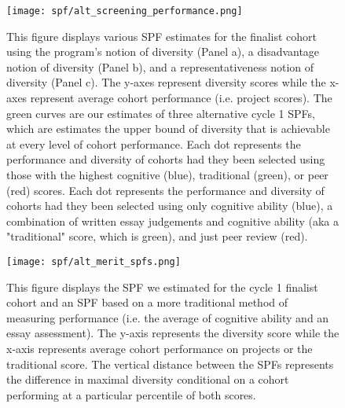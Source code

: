     \newpage
    \begin{figure}[!htb]
    \centering
        \caption{This figure displays various SPF estimates for the  finalist cohort using the program's notion of diversity (Panel a), a disadvantage notion of diversity (Panel b), and a representativeness notion of diversity (Panel c). The y-axes represent diversity scores while the x-axes represent average cohort performance (i.e. project scores). The green curves are our estimates of three alternative cycle 1 SPFs, which are estimates the upper bound of diversity that is achievable at every level of cohort performance. Each dot represents the performance and diversity of cohorts had they been selected using those with the highest cognitive (blue), traditional (green), or peer (red) scores.  Each dot represents the performance and diversity of cohorts had they been selected using only cognitive ability (blue), a combination of written essay judgements and cognitive ability (aka a "traditional" score, which is green), and just peer review (red).} \label{fig:alt_screen}
      \texttt{[image: spf/alt\_screening\_performance.png]} 
    \end{figure}
    
    \newpage
    \begin{figure}[!htb]
    \centering
        \caption{This figure displays the SPF we estimated for the cycle 1 finalist cohort and an SPF based on a more traditional method of measuring performance (i.e. the average of cognitive ability and an essay assessment). The y-axis represents the diversity score while the x-axis represents average cohort performance on projects or the traditional score. The vertical distance between the SPFs represents the difference in maximal diversity conditional on a cohort performing at a particular percentile of both scores. } \label{fig:compare_div_tradeoffs}
      \texttt{[image: spf/alt\_merit\_spfs.png]} 
    \end{figure}
    
    \newpage
    
